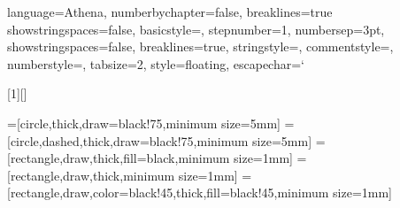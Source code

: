  {language=Athena,
  numberbychapter=false,
  breaklines=true
  showstringspaces=false,
  basicstyle=\scriptsize\ttfamily,
  stepnumber=1,
  numbersep=3pt,
  showstringspaces=false,
  breaklines=true,
  stringstyle=\color{blue}\ttfamily,
  commentstyle=\scriptsize\color{delim}\ttfamily,
  numberstyle=\scriptsize\color{gray},
  tabsize=2, 
  style=floating,
  escapechar=`
}
 
[1][]
 {\lstset{style=Athena,#1}}{}  

 




=[circle,thick,draw=black!75,minimum size=5mm]
=[circle,dashed,thick,draw=black!75,minimum size=5mm]
=[rectangle,draw,thick,fill=black,minimum size=1mm]
=[rectangle,draw,thick,minimum size=1mm]
=[rectangle,draw,color=black!45,thick,fill=black!45,minimum size=1mm]



\newcommand{\artlang}{SCuLPT\xspace}




\let\orig@figure\figure
\renewcommand*{\figure}[1][]{\orig@figure[#1]\vspace{-0ex}} %
\let\orig@endfigure\endfigure
\renewcommand*{\endfigure}{\vspace{-0ex}\orig@endfigure} %

\usepackage{caption}
\captionsetup[figure]{aboveskip=-0.1em,belowskip=-0.2em}
\captionsetup[table]{aboveskip=0em,belowskip=-0.5em}

\makeatother